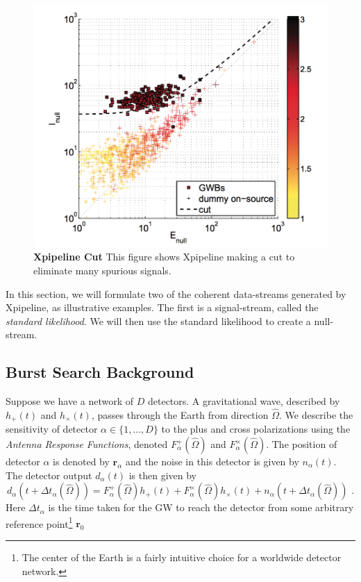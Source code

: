 \documentclass[11pt]{cuthesis}
\newcommand{\fs}{\text{ .}}
\newcommand{\Fp}{F^{+}_{\alpha}}
\newcommand{\Fx}{F^{\times}_{\alpha}}
\begin{document}
\begin{figure} %
\begin{center}
\includegraphics[width=0.8\linewidth]{xpipeline_cut.png}
\end{center}
\caption{\textbf{Xpipeline Cut} This figure shows Xpipeline making a cut to eliminate many spurious signals. } %
\label{fig:xcuts}
\end{figure}

In this section, we will formulate two of the coherent data-streams generated by Xpipeline, as illustrative examples. The first is a signal-stream, called the \textit{standard likelihood}. We will then use the standard likelihood to create a null-stream. 

\subsection{Burst Search Background}
Suppose we have a network of $D$ detectors. A gravitational wave, described by $h_+(t)$ and $h_\times (t)$, passes through the Earth from direction $\hat{\Omega}$. We describe the sensitivity of detector $\alpha \in \{1,...,D \}$ to the plus and cross polarizations using the \emph{Antenna Response Functions}, denoted $\Fp (\hat{\Omega})$ and $\Fx(\hat{\Omega})$. The position of detector $\alpha$ is denoted by $\textbf{r}_\alpha$ and the noise in this detector is given by $n_\alpha (t)$. The detector output $d_\alpha (t)$ is then given by
\begin{equation} \label{det_output}
d_\alpha (t + \Delta t_\alpha (\hat{\Omega})) = \Fp (\hat{\Omega}) h_+ (t) + \Fx (\hat{\Omega}) h_\times (t) + n_\alpha (t + \Delta t_\alpha (\hat{\Omega})) \fs
\end{equation}   
Here $\Delta t_\alpha$ is the time taken for the GW to reach the detector from some arbitrary reference point\footnote{The center of the Earth is a fairly intuitive choice for a worldwide detector network.} $\textbf{r}_0$
\end{document}
